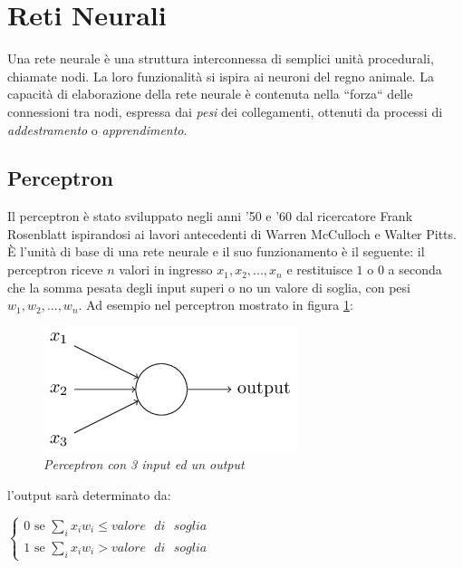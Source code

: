 \documentclass[12pt,a4paper]{report}
\begin{document}
\section{Reti Neurali}

Una rete neurale è una struttura interconnessa di semplici unità procedurali, chiamate nodi. La loro funzionalità si ispira ai neuroni del regno animale. La capacità di elaborazione della rete neurale è contenuta nella ``forza`` delle connessioni tra nodi, espressa dai \textit{pesi} dei collegamenti, ottenuti da processi di \textit{ addestramento} o \textit{apprendimento}. \cite{neural-net-gurney}

\subsection{Perceptron}

\cite{neural-net-nielsen}
Il perceptron è stato sviluppato negli anni '50 e '60 dal ricercatore Frank Rosenblatt ispirandosi ai lavori antecedenti di Warren McCulloch e Walter Pitts.
È l'unità di base di una rete neurale e il suo funzionamento è il seguente:
il perceptron riceve $n$ valori in ingresso $x_{1},x_{2},...,x_{n}$ e restituisce $1$ o $0$ a seconda che la somma pesata degli input superi o no un valore di soglia, con pesi $w_{1},w_{2},...,w_{n}$.
Ad esempio nel perceptron mostrato in figura \ref{perceptron}:

\begin{figure}[H]
 \centering
 \includegraphics[scale = 0.7]{images/perceptron.png}
 \caption{\textit{Perceptron con 3 input ed un output}}
 \label{perceptron}
\end{figure}

l'output sarà determinato da:

\begin{center}
$\begin{cases}
 0 \text{ se } \sum_{i} x_{i}w_{i} \leq valore\text{ }di\text{ }soglia\\
 1 \text{ se } \sum_{i} x_{i}w_{i} > valore\text{ }di\text{ }soglia 
\end{cases} $
\end{center}
\end{document}
